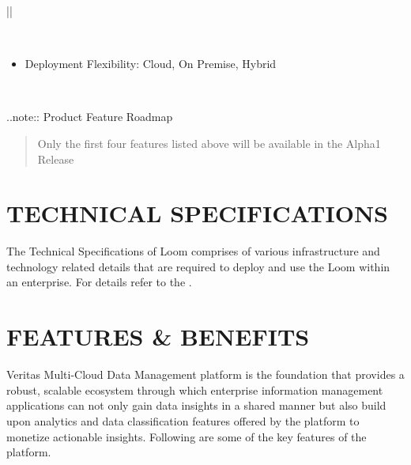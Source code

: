 \documentclass[letterpaper,10pt,english]{sphinxhowto}
\begin{document}
\begin{savenotes}
\begin{tabular}[t]{|*{1}{|}}
\begin{itemize}
\end{itemize}
\\
\hline\begin{itemize}
\item {} 
Deployment Flexibility: Cloud, On Premise, Hybrid

\end{itemize}
\\
\hline
\end{tabular}
\par
\sphinxattableend\end{savenotes}

..note:: Product Feature Roadmap
\begin{quote}

Only the first four features listed above will be available in the Alpha1 Release
\end{quote}


\section{TECHNICAL SPECIFICATIONS}
\label{\detokenize{col/ds/mcdmp_ds_opt1:technical-specifications}}
The Technical Specifications of Loom comprises of various infrastructure and technology related details that are required to deploy and use the Loom within an enterprise. For details refer to the .


\section{FEATURES \& BENEFITS}
\label{\detokenize{col/ds/mcdmp_ds_opt1:features-benefits}}
Veritas Multi-Cloud Data Management platform is the foundation that provides a robust, scalable ecosystem through which enterprise information management applications can not only gain data insights in a shared manner but also build upon analytics and data classification features offered by the platform to monetize actionable insights. Following are some of the key features of the platform.
\end{document}
